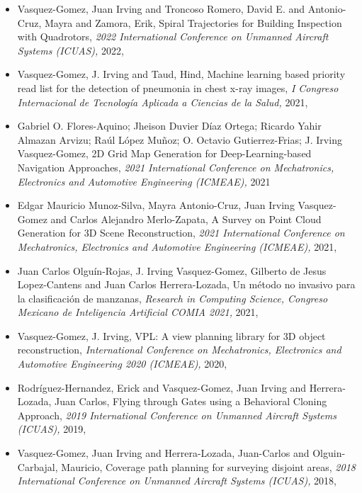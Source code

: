 \begin{itemize} 
\item Vasquez-Gomez, Juan Irving and Troncoso Romero, David E. and Antonio-Cruz, Mayra and Zamora, Erik, Spiral Trajectories for Building Inspection with Quadrotors, \textit{ 2022 International Conference on Unmanned Aircraft Systems (ICUAS),} 2022, \href{10.1109/ICUAS54217.2022.9836133} {\faFilePdfO} 
\item Vasquez-Gomez, J. Irving and Taud, Hind, Machine learning based priority read list for the detection of pneumonia in chest x-ray images, \textit{ I Congreso Internacional de Tecnología Aplicada a Ciencias de la Salud,} 2021, \href{} {\faFilePdfO} 
\item Gabriel O. Flores-Aquino; Jheison Duvier Díaz Ortega; Ricardo Yahir Almazan Arvizu; Raúl López Muñoz; O. Octavio Gutierrez-Frias; J. Irving Vasquez-Gomez, 2D Grid Map Generation for Deep-Learning-based Navigation Approaches, \textit{ 2021 International Conference on Mechatronics, Electronics and Automotive Engineering (ICMEAE),} 2021 
\item Edgar Mauricio Munoz-Silva, Mayra Antonio-Cruz, Juan Irving Vasquez-Gomez and Carlos Alejandro Merlo-Zapata, A Survey on Point Cloud Generation for 3D Scene Reconstruction, \textit{ 2021 International Conference on Mechatronics, Electronics and Automotive Engineering (ICMEAE),} 2021, \href{10.1109/ICMEAE55138.2021.00021} {\faFilePdfO} 
\item Juan Carlos Olguín-Rojas, J. Irving Vasquez-Gomez, Gilberto de Jesus Lopez-Cantens and Juan Carlos Herrera-Lozada, Un método no invasivo para la clasificación de manzanas, \textit{ Research in Computing Science, Congreso Mexicano de Inteligencia Artificial COMIA 2021,} 2021, \href{} {\faFilePdfO} 
\item Vasquez-Gomez, J. Irving, VPL: A view planning library for 3D object reconstruction, \textit{ International Conference on Mechatronics, Electronics and Automotive Engineering 2020 (ICMEAE),} 2020, \href{https://doi.org/10.1109/ICMEAE51770.2020.00010} {\faFilePdfO} 
\item Rodríguez-Hernandez, Erick and Vasquez-Gomez, Juan Irving and Herrera-Lozada, Juan Carlos, Flying through Gates using a Behavioral Cloning Approach, \textit{ 2019 International Conference on Unmanned Aircraft Systems (ICUAS),} 2019, \href{https://doi.org/10.1109/ICUAS.2019.8798172} {\faFilePdfO} 
\item Vasquez-Gomez, Juan Irving and Herrera-Lozada, Juan-Carlos and Olguin-Carbajal, Mauricio, Coverage path planning for surveying disjoint areas, \textit{ 2018 International Conference on Unmanned Aircraft Systems (ICUAS),} 2018, \href{https://doi.org/10.1109/ICUAS.2018.8453386} {\faFilePdfO} 

\end{itemize}
